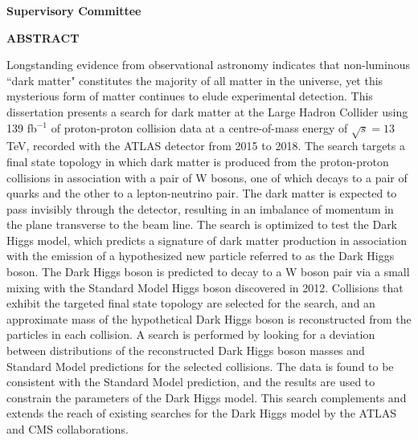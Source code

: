 \newpage
{}

\noindent \textbf{Supervisory Committee}
\tpbreak
\panel %

\newpage

\begin{center}
\textbf{ABSTRACT}
\end{center}

Longstanding evidence from observational astronomy indicates that non-luminous ``dark matter" constitutes the majority of all matter in the universe, yet this mysterious form of matter continues to elude experimental detection. This dissertation presents a search for dark matter at the Large Hadron Collider using 139 fb\(^{-1}\) of proton-proton collision data at a centre-of-mass energy of \(\sqrt{s} = 13\,\)TeV, recorded with the ATLAS detector from 2015 to 2018. The search targets a final state topology in which dark matter is produced from the proton-proton collisions in association with a pair of W bosons, one of which decays to a pair of quarks and the other to a lepton-neutrino pair. The dark matter is expected to pass invisibly through the detector, resulting in an imbalance of momentum in the plane transverse to the beam line. The search is optimized to test the Dark Higgs model, which predicts a signature of dark matter production in association with the emission of a hypothesized new particle referred to as the Dark Higgs boson. The Dark Higgs boson is predicted to decay to a W boson pair  via a small mixing with the Standard Model Higgs boson discovered in 2012. Collisions that exhibit the targeted final state topology are selected for the search, and an approximate mass of the hypothetical Dark Higgs boson is reconstructed from the particles in each collision. A search is performed by looking for a deviation between distributions of the reconstructed Dark Higgs boson masses and Standard Model predictions for the selected collisions. The data is found to be consistent with the Standard Model prediction, and the results are used to constrain the parameters of the Dark Higgs model. This search complements and extends the reach of existing searches for the Dark Higgs model by the ATLAS and CMS collaborations.



